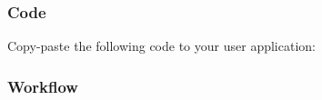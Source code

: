 \hypertarget{asfdoc_sam0_sercom_usart_basic_use_case_asfdoc_sam0_usart_basic_use_case_main_code}{}\subsubsection{Code}\label{asfdoc_sam0_sercom_usart_basic_use_case_asfdoc_sam0_usart_basic_use_case_main_code}
Copy-\/paste the following code to your user application\+: 
\begin{DoxyCodeInclude}
\end{DoxyCodeInclude}
 \hypertarget{asfdoc_sam0_sercom_usart_basic_use_case_asfdoc_sam0_usart_basic_use_case_main_flow}{}\subsubsection{Workflow}\label{asfdoc_sam0_sercom_usart_basic_use_case_asfdoc_sam0_usart_basic_use_case_main_flow}

